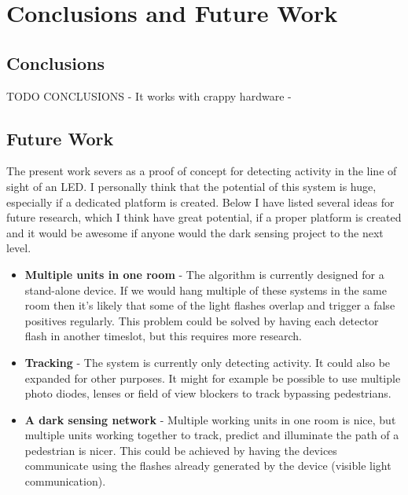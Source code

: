\chapter{Conclusions and Future Work}
\label{chp:conclusionsandfuturework}

\section{Conclusions}
TODO CONCLUSIONS
 - It works with crappy hardware
 - 

	

\section{Future Work}
The present work severs as a proof of concept for detecting activity in the line of sight of an LED. I personally think that the potential of this system is huge, especially if a dedicated platform is created. Below I have listed several ideas for future research, which I think have great potential, if a proper platform is created and it would be awesome if anyone would the dark sensing project to the next level.

\begin{itemize}
	\item \textbf{Multiple units in one room} - The algorithm is currently designed for a stand-alone device. If we would hang multiple of these systems in the same room then it's likely that some of the light flashes overlap and trigger a false positives regularly. This problem could be solved by having each detector flash in another timeslot, but this requires more research.
	\item \textbf{Tracking} - The system is currently only detecting activity. It could also be expanded for other purposes. It might for example be possible to use multiple photo diodes, lenses or field of view blockers to track bypassing pedestrians.
	\item \textbf{A dark sensing network} - Multiple working units in one room is nice, but multiple units working together to track, predict and illuminate the path of a pedestrian is nicer. This could be achieved by having the devices communicate using the flashes already generated by the device (visible light communication).
\end{itemize}